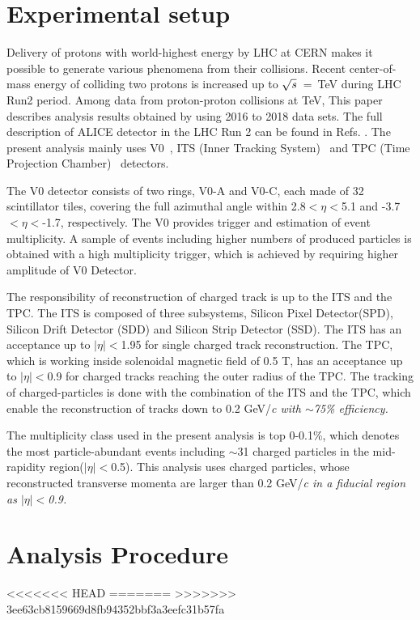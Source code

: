 
\section{Experimental setup}
\label{sec:experiment}

Delivery of protons with world-highest energy by LHC at CERN makes it possible to generate various phenomena from their collisions. Recent center-of-mass energy of colliding two protons is increased up to $\sqrt{\it{s}}$~=~\unit[13]{TeV} during LHC Run2 period. Among data from proton-proton collisions at \unit[13]{TeV}, This paper describes analysis results obtained by using 2016 to 2018 data sets. The full description of ALICE detector in the LHC Run 2 can be found in Refs. \cite{Aamodt:2008zz,Abelev:2014ffa}. The present analysis mainly uses V0~\cite{Abbas:2013taa}, ITS (Inner Tracking System)~\cite{aliceITS} and TPC (Time Projection Chamber)~\cite{aliceTPC} detectors.

The V0 detector consists of two rings, V0-A and V0-C, each made of 32 scintillator tiles, covering the full azimuthal angle within 2.8$<\eta<$5.1 and -3.7$<\eta<$-1.7, respectively. The V0 provides trigger and estimation of event multiplicity. A sample of events including higher numbers of produced particles is obtained with a high multiplicity trigger, which is achieved by requiring higher amplitude of V0 Detector. 

The responsibility of reconstruction of charged track is up to the ITS and the TPC. The ITS is composed of three subsystems, Silicon Pixel Detector(SPD), Silicon Drift Detector (SDD) and Silicon Strip Detector (SSD). The ITS has an acceptance up to $|\eta|<$1.95 for single charged track reconstruction. The TPC, which is working inside solenoidal magnetic field of 0.5 T, has an acceptance up to $|\eta|<$0.9 for charged tracks reaching the outer radius of the TPC. The tracking of charged-particles is done with the combination of the ITS and the TPC, which enable the reconstruction of tracks down to 0.2 GeV/\it{c}\rm{} with $\sim$75\% efficiency.

The multiplicity class used in the present analysis is top 0-0.1\%, which denotes the most particle-abundant events including  $\sim$31 charged particles in the mid-rapidity region($|\eta|<$0.5). This analysis uses charged particles, whose reconstructed transverse momenta are larger than 0.2 GeV/\it{c}\rm{} in a fiducial region as $|\eta|<$0.9. 

\section{Analysis Procedure}
<<<<<<< HEAD
\label{sec:ana}
=======
\label{sec:an}
>>>>>>> 3ee63cb8159669d8fb94352bbf3a3eefc31b57fa

